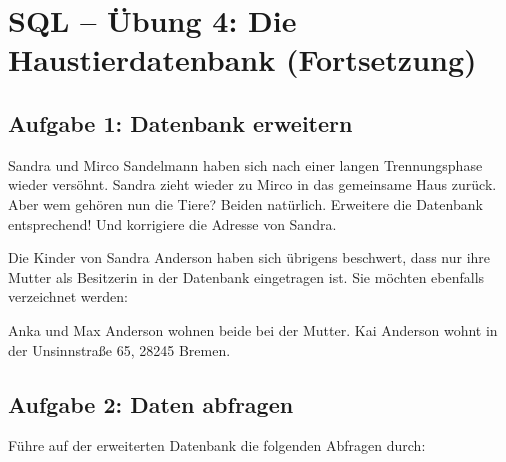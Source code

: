 \clearpage

\rehead[]{\textcolor{lightblue}{AvHG, Inf, My}}
\lohead[]{\textcolor{lightblue}{AvHG, Inf, My}}

\section[\hspace{1mm} SQL -- Übung 4: Die Haustierdatenbank (Fortsetzung)]{SQL -- Übung 4: Die Haustierdatenbank (Fortsetzung)}

\subsection{Aufgabe 1: Datenbank erweitern}

Sandra und Mirco Sandelmann haben sich nach einer langen Trennungsphase wieder
versöhnt. Sandra zieht wieder zu Mirco in das gemeinsame Haus zurück. Aber wem
gehören nun die Tiere? Beiden natürlich. Erweitere die Datenbank entsprechend!
Und korrigiere die Adresse von Sandra.

Die Kinder von Sandra Anderson haben sich übrigens beschwert, dass nur ihre
Mutter als Besitzerin in der Datenbank eingetragen ist. Sie möchten ebenfalls
verzeichnet werden:

Anka und Max Anderson wohnen beide bei der Mutter. Kai Anderson wohnt in der
Unsinnstraße 65, 28245 Bremen.


\subsection{Aufgabe 2: Daten abfragen}

Führe auf der erweiterten Datenbank die folgenden Abfragen durch:

